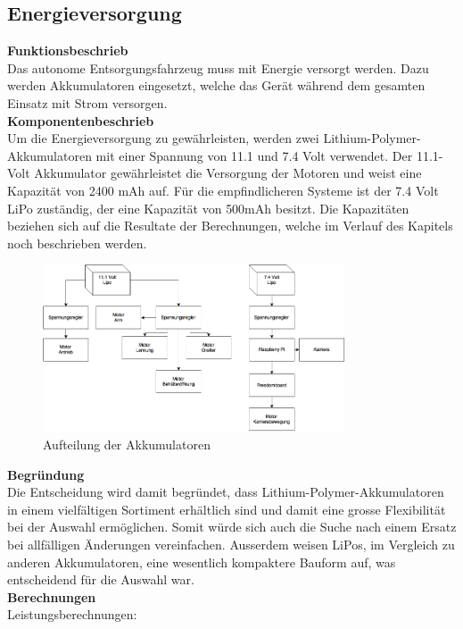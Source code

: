 \subsection{Energieversorgung}
%
\textbf{Funktionsbeschrieb}\\[0.2cm]
Das autonome Entsorgungsfahrzeug muss mit Energie versorgt werden. Dazu werden Akkumulatoren eingesetzt, welche das Gerät während dem gesamten Einsatz mit Strom versorgen. 
\\[0.2cm]
\textbf{Komponentenbeschrieb}\\[0.2cm]
Um die Energieversorgung zu gewährleisten, werden zwei Lithium-Polymer-Akkumulatoren mit einer Spannung von 11.1 und 7.4 Volt verwendet.
Der 11.1-Volt Akkumulator gewährleistet die Versorgung der Motoren und weist eine Kapazität von 2400 mAh auf. Für die empfindlicheren Systeme ist der 7.4 Volt LiPo zuständig, der eine Kapazität von 500mAh besitzt.
Die Kapazitäten beziehen sich auf die Resultate der Berechnungen, welche im Verlauf des Kapitels noch beschrieben werden.
\begin{figure}[H]
\centering
\includegraphics[width=0.8\textwidth]{03_Loesungskonzept/pictures/speisung.png}
\caption{Aufteilung der Akkumulatoren}	
\end{figure}
\textbf{Begründung}\\[0.2cm]
Die Entscheidung wird damit begründet, dass Lithium-Polymer-Akkumulatoren in einem vielfältigen Sortiment erhältlich sind und damit eine grosse Flexibilität bei der Auswahl ermöglichen. Somit würde sich auch die Suche nach einem Ersatz bei allfälligen Änderungen vereinfachen. Ausserdem weisen LiPos, im Vergleich zu anderen Akkumulatoren, eine wesentlich kompaktere Bauform auf, was entscheidend für die Auswahl war. \\[0.2cm]
\textbf{Berechnungen}\\[0.2cm]
Leistungsberechnungen:
